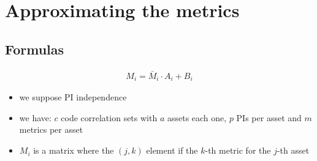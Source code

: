 \documentclass[9pt]{scrartcl}
\begin{document}
\newpage

\section*{Approximating the metrics}

\subsection*{Formulas}

\begin{align*}
	M_i = \bar{M}_i \cdot A_i + B_i
\end{align*}

\begin{itemize}
	\item we suppose PI independence
	\item we have: $c$ code correlation sets with $a$ assets each one, $p$ PIs per asset and $m$ metrics per asset
	\item $M_i$ is a matrix where the $(j, k)$ element if the $k$-th metric for the $j$-th asset
\end{itemize}
\end{document}
